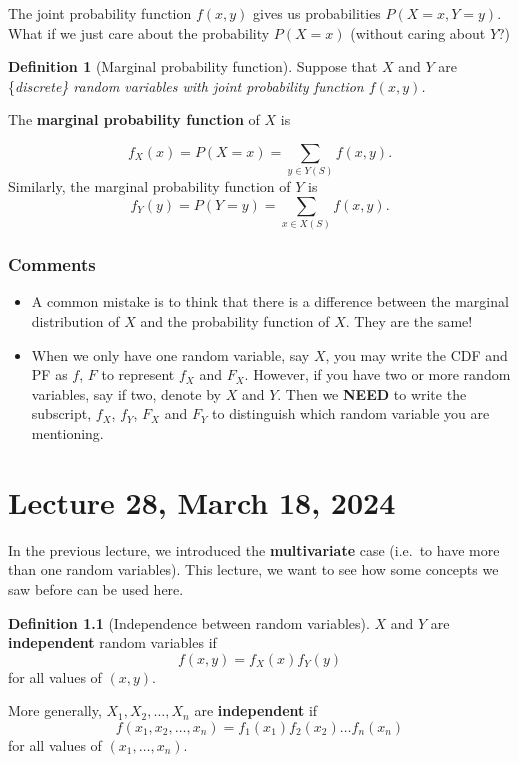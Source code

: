 \documentclass[
]{book}
\theoremstyle{definition}
\newtheorem{definition}{Definition}[chapter]
\theoremstyle{definition}
\theoremstyle{definition}
\theoremstyle{definition}
\theoremstyle{remark}
\begin{document}
The joint probability function \(f(x,y)\) gives us probabilities \(P(X=x, Y=y)\). What if we just care about the probability \(P(X=x)\) (without caring about \(Y\)?)

\begin{definition}[Marginal probability function]
Suppose that \(X\) and \(Y\) are \{\it discrete\} random variables with joint probability function \(f(x,y)\).

The \textbf{marginal probability function} of \(X\) is

\[
f_X(x) = P( X=x )= \sum_{y \in Y(S)} f(x,y).
\]
Similarly, the marginal probability function of \(Y\) is
\[
f_Y(y) = P( Y=y )= \sum_{x \in X(S)} f(x,y).
\]
\end{definition}

\subsection{Comments}\label{comments}

\begin{itemize}
\item
  A common mistake is to think that there is a difference between the marginal distribution of \(X\) and the probability function of \(X\). They are the same!
\item
  When we only have one random variable, say \(X\), you may write the CDF and PF as \(f\), \(F\) to represent \(f_X\) and \(F_X\). However, if you have two or more random variables, say if two, denote by \(X\) and \(Y\). Then we \textbf{NEED} to write the subscript, \(f_X\), \(f_Y\), \(F_X\) and \(F_Y\) to distinguish which random variable you are mentioning.
\end{itemize}

\chapter{Lecture 28, March 18, 2024}\label{lecture-28-march-18-2024}

\newcommand{\var}{\mathbb{V}ar}
\newcommand{\R}{\mathbb{R}}
\newcommand{\E}{\mathbb{E}}
\newcommand{\N}{\mathcal{N}}

In the previous lecture, we introduced the \textbf{multivariate} case (i.e.~to have more than one random variables). This lecture, we want to see how some concepts we saw before can be used here.

\begin{definition}[Independence between random variables]
\(X\) and \(Y\) are \textbf{independent} random variables if
\[
f(x,y) = f_X(x) f_Y(y)
\]
for all values of \((x,y)\).

More generally, \(X_1, X_2, \ldots, X_n\) are \textbf{independent} if
\[
f(x_1, x_2, \ldots, x_n) = f_1(x_1) f_2(x_2) \ldots f_n(x_n)
\]
for all values of \((x_1, \ldots, x_n)\).
\end{definition}
\end{document}
